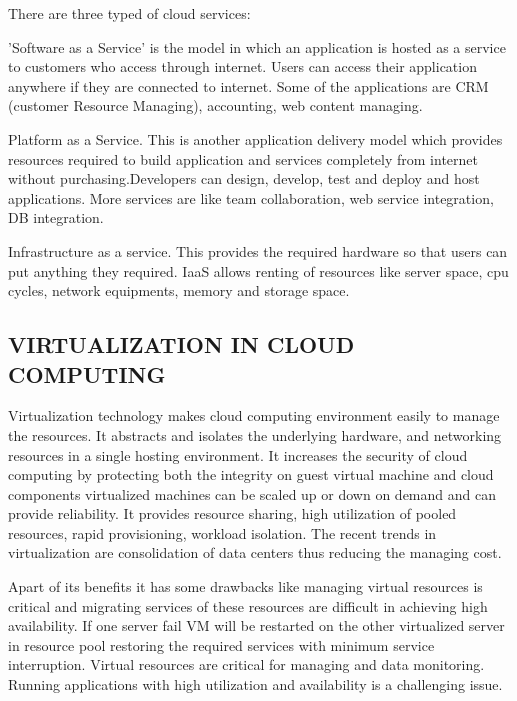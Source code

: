 There are three typed of cloud services:
\begin{description}
\item[Saas]
\item 'Software as a Service' is the model in which an application is hosted as a service to customers who access through internet. Users can access their application anywhere if they are connected to internet. Some of the applications are CRM (customer Resource Managing), accounting, web content managing.
\end{description}
\begin{description}
\item[PaaS]
\item  Platform as a Service. This is another application delivery model which provides resources required to
build application and services completely from internet without purchasing.Developers can design, develop, test and deploy and host applications. More services are like team collaboration, web service integration, DB integration.
\end{description}
\begin{description}
\item[IaaS]
\item  Infrastructure as a service. This provides the required hardware so that users can put anything they
required. IaaS allows renting of resources like server space, cpu cycles, network equipments, memory and
storage space.
\end{description}

\subsection{VIRTUALIZATION IN CLOUD COMPUTING}
Virtualization technology makes cloud computing environment easily to manage the resources. It abstracts and
isolates the underlying hardware, and networking resources in a single hosting environment. It increases the security of cloud computing by protecting both the integrity on guest virtual machine and
cloud components virtualized machines can be scaled up or down on demand and can provide reliability. It
provides resource sharing, high utilization of pooled resources, rapid provisioning, workload isolation.
The recent trends in virtualization are consolidation of data centers thus reducing the managing cost.

Apart of its benefits it has some drawbacks like managing virtual resources is critical and migrating services of these resources are difficult in achieving high availability.
If one server fail VM will be restarted on the other virtualized server in resource pool restoring the required
services with minimum service interruption.
Virtual resources are critical for managing and data monitoring. Running applications with high utilization and
availability is a challenging issue. 

